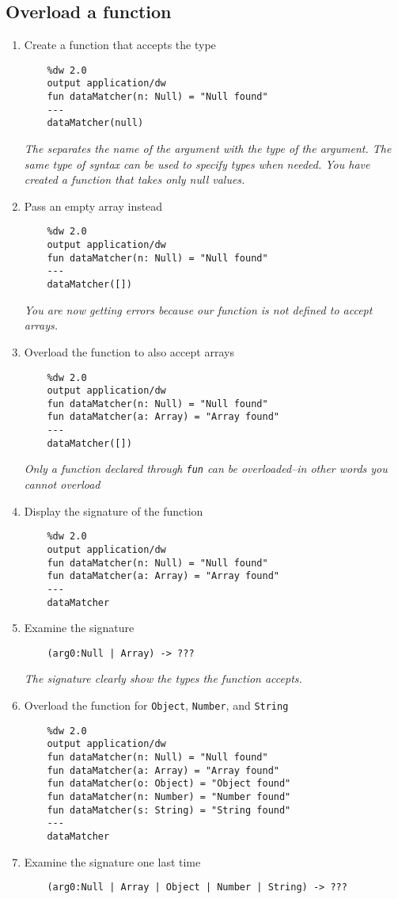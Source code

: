 \subsection{Overload a function}
\begin{enumerate}[resume*]
\item Create a function that accepts the  type
  \begin{verbatim}
    %dw 2.0
    output application/dw
    fun dataMatcher(n: Null) = "Null found"
    ---
    dataMatcher(null)
  \end{verbatim}
  \emph{
    The \ttt{:} separates the name of the argument with the type of the argument.  The same type of syntax can be used to specify types when needed.
    \newline
    You have created a function that takes only null values.
  }
\item Pass an empty array instead
  \begin{verbatim}
    %dw 2.0
    output application/dw
    fun dataMatcher(n: Null) = "Null found"
    ---
    dataMatcher([])
  \end{verbatim}
  \emph{
    You are now getting errors because our function is not defined to accept arrays.
  }
\item Overload the function to also accept arrays
  \begin{verbatim}
    %dw 2.0
    output application/dw
    fun dataMatcher(n: Null) = "Null found"
    fun dataMatcher(a: Array) = "Array found"
    ---
    dataMatcher([])
  \end{verbatim}
  \emph{
    Only a function declared through \lstinline{fun} can be overloaded--in other words you cannot overload \lep
  }
\item Display the signature of the  function
  \begin{verbatim}
    %dw 2.0
    output application/dw
    fun dataMatcher(n: Null) = "Null found"
    fun dataMatcher(a: Array) = "Array found"
    ---
    dataMatcher
  \end{verbatim}
\item Examine the signature
  \begin{verbatim}
    (arg0:Null | Array) -> ???
  \end{verbatim}
  \emph{
    The signature clearly show the types the function accepts.
  }
\item Overload the function for \lstinline{Object}, \lstinline{Number}, and \lstinline{String}
  \begin{verbatim}
    %dw 2.0
    output application/dw
    fun dataMatcher(n: Null) = "Null found"
    fun dataMatcher(a: Array) = "Array found"
    fun dataMatcher(o: Object) = "Object found"
    fun dataMatcher(n: Number) = "Number found"
    fun dataMatcher(s: String) = "String found"
    ---
    dataMatcher
  \end{verbatim}
\item Examine the signature one last time
  \begin{verbatim}
    (arg0:Null | Array | Object | Number | String) -> ???
  \end{verbatim}
\end{enumerate}

